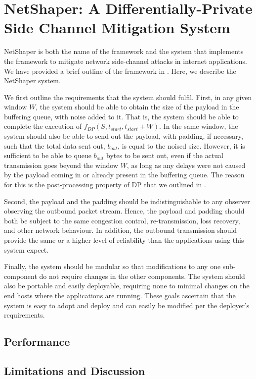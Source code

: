 \chapter{NetShaper: A Differentially-Private Side Channel Mitigation System}

NetShaper \cite{sabzi2024netshaper} is both the name of the framework and the system that implements the framework to mitigate network side-channel attacks in internet applications.
We have provided a brief outline of the framework in . 
Here, we describe the NetShaper system.

We first outline the requirements that the system should fulfil.
First, in any given window $W$, the system should be able to obtain the size of the payload in the buffering queue, with noise added to it. 
That is, the system should be able to complete the execution of $f_{DP}(S, t_{start}, t_{start} + W)$.
In the same window, the system should also be able to send out the payload, with padding, if necessary, such that the total data sent out, $b_{out}$, is equal to the noised size. 
However, it is sufficient to be able to queue $b_{out}$ bytes to be sent out, even if the actual transmission goes beyond the window $W$, as long as any delays were not caused by the payload coming in or already present in the buffering queue. 
The reason for this is the post-processing property of DP that we outlined in .

Second, the payload and the padding should be indistinguishable to any observer observing the outbound packet stream.
Hence, the payload and padding should both be subject to the same congestion control, re-transmission, loss recovery, and other network behaviour.
In addition, the outbound transmission should provide the same or a higher level of reliability than the applications using this system expect.

Finally, the system should be modular so that modifications to any one sub-component do not require changes in the other components.
The system should also be portable and easily deployable, requiring none to minimal changes on the end hosts where the applications are running.
These goals ascertain that the system is easy to adopt and deploy and can easily be modified per the deployer's requirements.





\section{Performance}\label{sec:netshaper-performance}
\section{Limitations and Discussion}\label{sec:netshaper-discussion}

\endinput